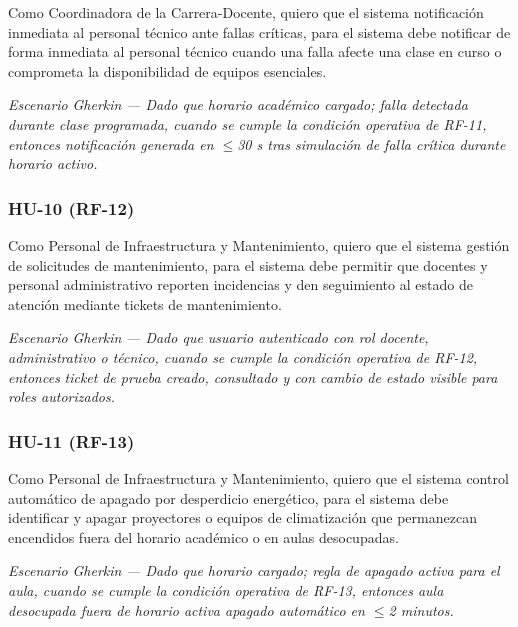 
Como Coordinadora de la Carrera-Docente, quiero que el sistema notificación inmediata al personal técnico ante fallas críticas, para el sistema debe notificar de forma inmediata al personal técnico cuando una falla afecte una clase en curso o comprometa la disponibilidad de equipos esenciales.


\textit{Escenario }\textit{Gherkin}\textit{ --- Dado que horario académico cargado; falla detectada durante clase programada, cuando se cumple la condición operativa de RF-11, entonces notificación generada en $\leq$30 s tras simulación de falla crítica durante horario activo.}


\subsubsection*{HU-10 (RF-12)}


Como Personal de Infraestructura y Mantenimiento, quiero que el sistema gestión de solicitudes de mantenimiento, para el sistema debe permitir que docentes y personal administrativo reporten incidencias y den seguimiento al estado de atención mediante tickets de mantenimiento.


\textit{Escenario }\textit{Gherkin}\textit{ --- Dado que usuario autenticado con rol docente, administrativo o técnico, cuando se cumple la condición operativa de RF-12, entonces }\textit{ticket}\textit{ de prueba creado, consultado y con cambio de estado visible para roles autorizados.}


\subsubsection*{HU-11 (RF-13)}


Como Personal de Infraestructura y Mantenimiento, quiero que el sistema control automático de apagado por desperdicio energético, para el sistema debe identificar y apagar proyectores o equipos de climatización que permanezcan encendidos fuera del horario académico o en aulas desocupadas.


\textit{Escenario }\textit{Gherkin}\textit{ --- Dado que horario cargado; regla de apagado activa para el aula, cuando se cumple la condición operativa de RF-13, entonces aula desocupada fuera de horario activa apagado automático en $\leq$2 minutos.}


